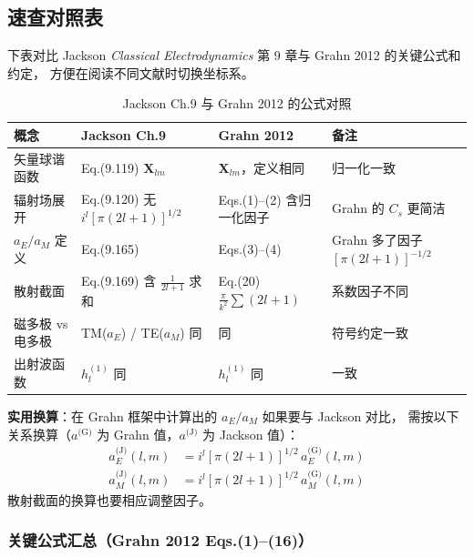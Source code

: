 \subsection{速查对照表}

下表对比 Jackson \textit{Classical Electrodynamics} 第 9 章与 Grahn 2012 的关键公式和约定，
方便在阅读不同文献时切换坐标系。

\begin{table}[htbp]
\centering
\caption{Jackson Ch.9 与 Grahn 2012 的公式对照}
\begin{tabular}{p{2.5cm}p{4cm}p{4cm}p{3.5cm}}
\toprule
\textbf{概念} & \textbf{Jackson Ch.9} & \textbf{Grahn 2012} & \textbf{备注} \\
\midrule
矢量球谐函数 & Eq.(9.119) $\mathbf{X}_{lm}$ & $\mathbf{X}_{lm}$，定义相同 & 归一化一致 \\
辐射场展开 & Eq.(9.120) 无 $i^l[\pi(2l+1)]^{1/2}$ & Eqs.(1)--(2) 含归一化因子 & Grahn 的 $C_s$ 更简洁 \\
$a_E/a_M$ 定义 & Eq.(9.165) & Eqs.(3)--(4) & Grahn 多了因子 $[\pi(2l+1)]^{-1/2}$ \\
散射截面 & Eq.(9.169) 含 $\frac{1}{2l+1}$ 求和 & Eq.(20) $\frac{\pi}{k^2}\sum(2l+1)$ & 系数因子不同 \\
磁多极 vs 电多极 & TM($a_E$) / TE($a_M$) 同 & 同 & 符号约定一致 \\
出射波函数 & $h_l^{(1)}$ 同 & $h_l^{(1)}$ 同 & 一致 \\
\bottomrule
\end{tabular}
\label{tab:compare}
\end{table}

\begin{noteworthy}
\textbf{实用换算}：在 Grahn 框架中计算出的 $a_E/a_M$ 如果要与 Jackson 对比，
需按以下关系换算（$a^{\text{(G)}}$ 为 Grahn 值，$a^{\text{(J)}}$ 为 Jackson 值）：
\begin{align}
  a_E^{\text{(J)}}(l,m) &= i^l[\pi(2l+1)]^{1/2}\,a_E^{\text{(G)}}(l,m) \\
  a_M^{\text{(J)}}(l,m) &= i^l[\pi(2l+1)]^{1/2}\,a_M^{\text{(G)}}(l,m)
\end{align}
散射截面的换算也要相应调整因子。
\end{noteworthy}

\subsubsection*{关键公式汇总（Grahn 2012 Eqs.(1)--(16)）}


